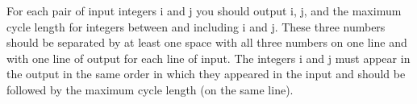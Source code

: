 For each pair of input integers i and j you should output i, j, and the maximum cycle length for integers between and including i and j. These three numbers should be separated by at least one space with all three numbers on one line and with one line of output for each line of input. The integers i and j must appear in the output in the same order in which they appeared in the input and should be followed by the maximum cycle length (on the same line).